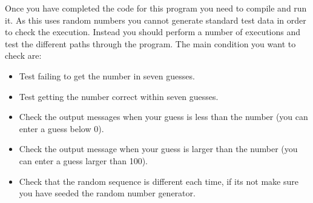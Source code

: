 Once you have completed the code for this program you need to compile and run it. As this uses random numbers you cannot generate standard test data in order to check the execution. Instead you should perform a number of executions and test the different paths through the program. The main condition you want to check are:
\begin{itemize}
  \item Test failing to get the number in seven guesses.
  \item Test getting the number correct within seven guesses.
  \item Check the output messages when your guess is less than the number (you can enter a guess below 0).
  \item Check the output message when your guess is larger than the number (you can enter a guess larger than 100).
  \item Check that the random sequence is different each time, if its not make sure you have seeded the random number generator.
\end{itemize}



